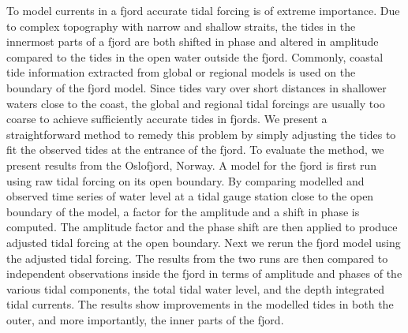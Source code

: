\date{Received: date / Accepted: date}


\maketitle

To model currents in a fjord accurate tidal forcing is of extreme importance. Due to complex topography with narrow and shallow straits, the tides in the innermost parts of a fjord are both shifted in phase and altered in amplitude compared to the tides in the open water outside the fjord.
Commonly, coastal tide information extracted from global or regional models is used on the boundary of the fjord model.
Since tides vary over short distances in shallower waters close to the coast, the global and regional tidal forcings are usually too coarse to achieve sufficiently accurate tides in fjords. We present a straightforward method to remedy this problem by simply adjusting the tides to fit the observed tides at the entrance of the fjord. 
To evaluate the method, we present results from the Oslofjord, Norway. 
A model for the fjord is first run using raw tidal forcing on its open boundary. By comparing modelled and observed time series of water level at a tidal gauge station close to the open boundary of the model, a factor for the amplitude and a shift in phase is computed. The amplitude factor and the phase shift are then applied to produce adjusted tidal forcing at the open boundary. Next we rerun the fjord model using the adjusted tidal forcing. The results from the two runs are then compared to independent observations inside the fjord in terms of amplitude and phases of the various tidal components, the total tidal water level, and the depth integrated tidal currents. The results show improvements in the modelled tides in both the outer, and more importantly, the inner parts of the fjord.












